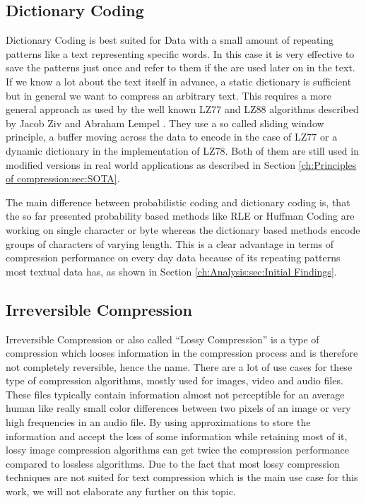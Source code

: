 \subsection{Dictionary Coding}
\par{
Dictionary Coding is best suited for Data with a small amount of repeating patterns like a text representing specific words. In this case it is very effective to save the patterns just once and refer to them if the are used later on in the text. If we know a lot about the text itself in advance, a static dictionary is sufficient but in general we want to compress an arbitrary text. This requires a more general approach as used by the well known LZ77 and LZ88 algorithms described by Jacob Ziv and Abraham Lempel \cite{lz}. They use a so called sliding window principle, a buffer moving across the data to encode in the case of LZ77 or a dynamic dictionary in the implementation of LZ78. Both of them are still used in modified versions in real world applications as described in Section \ref{ch:Principles of compression:sec:SOTA}.
}
\par{
The main difference between probabilistic coding and dictionary coding is, that the so far presented probability based methods like RLE or Huffman Coding are working on single character or byte whereas the dictionary based methods encode groups of characters of varying length. This is a clear advantage in terms of compression performance on every day data because of its repeating patterns most textual data has, as shown in Section \ref{ch:Analysis:sec:Initial Findings}.
}


\subsection{Irreversible Compression}
\par{
Irreversible Compression or also called \enquote{Lossy Compression} is a type of compression which looses information in the compression process and is therefore not completely reversible, hence the name. There are a lot of use cases for these type of compression algorithms, mostly used for images, video and audio files. These files typically contain information almost not perceptible for an average human like really small color differences between two pixels of an image or very high frequencies in an audio file. By using approximations to store the information and accept the loss of some information while retaining most of it, lossy image compression algorithms can get twice the compression performance compared to lossless algorithms. Due to the fact that most lossy compression techniques are not suited for text compression which is the main use case for this work, we will not elaborate any further on this topic.
}


